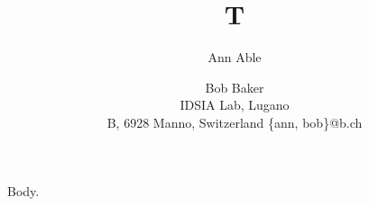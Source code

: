 \documentclass{article}
\begin{document}
\title{T}
\author{Ann Able \and Bob Baker\\
IDSIA Lab, Lugano\\
\small{B, 6928 Manno, Switzerland {\{ann, bob\}@b.ch}}}
\maketitle
Body.
\end{document}
